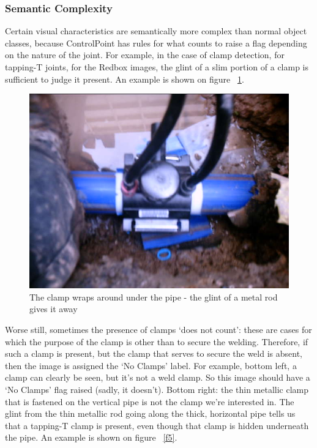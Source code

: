 \documentclass[a4paper,11pt]{article}
\begin{document}
\subsubsection{Semantic Complexity}

Certain visual characteristics are semantically more complex than normal object classes, because ControlPoint has rules for what counts to raise a flag depending on the nature of the joint. For example, in the case of clamp detection, for tapping-T joints, for the Redbox images, the glint of a slim portion of a clamp is sufficient to judge it present. An example is shown on figure ~\ref{f4}. \\

\begin{figure}[h!]
	\centering
	\includegraphics[width=0.35\linewidth]{images/tapping-T.jpg}
	\caption{The clamp wraps around under the pipe - the glint of a metal rod gives it away}
    \label{f4}
\end{figure}

Worse still, sometimes the presence of clamps `does not count': these are cases for which the purpose of the clamp is other than to secure the welding. Therefore, if such a clamp is present, but the clamp that serves to secure the weld is absent, then the image is assigned the `No Clamps' label. For example, bottom left, a clamp can clearly be seen, but it's not a weld clamp. So this image should have a `No Clamps' flag raised (sadly, it doesn't). Bottom right: the thin metallic clamp that is fastened on the vertical pipe is not the clamp we're interested in. The glint from the thin metallic rod going along the thick, horizontal pipe tells us that a tapping-T clamp is present, even though that clamp is hidden underneath the pipe. An example is shown on figure ~\ref{f5}.
\end{document}
